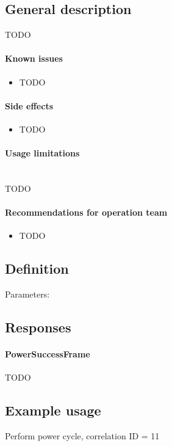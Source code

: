 

\subsection{General description}
TODO


\paragraph{Known issues}
\begin{itemize}
	\item TODO
\end{itemize}

\paragraph{Side effects}
\begin{itemize}
	\item TODO
\end{itemize}

\paragraph{Usage limitations}\mbox{}\\ 
TODO

\paragraph{Recommendations for operation team}
\begin{itemize}
	\item TODO
\end{itemize}


\subsection{Definition}

Parameters: 

\begin{tcarglist}
\end{tcarglist}


\subsection{Responses}

\paragraph{PowerSuccessFrame}
TODO


\subsection{Example usage}
Perform power cycle, correlation ID = 11

